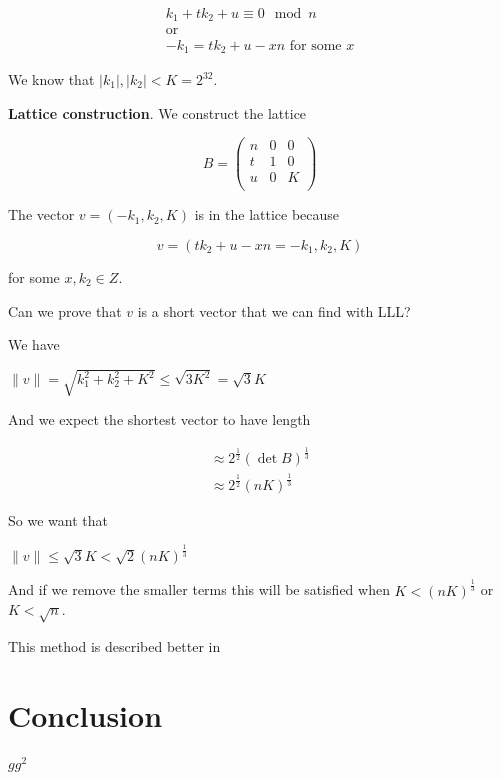 \documentclass[a4paper,12pt]{report}
\begin{document}
\[
    \begin{array}{c}
        k_1 + tk_2 + u \equiv 0 \mod n \\
        \text{or} \\
        -k_1 = tk_2 + u - xn \text{   for some $x$}
    \end{array}
\]

We know that $|k_1|, |k_2| < K = 2^{32}$.

\vspace*{10px}

\textbf{Lattice construction}. We construct the lattice

\[
    B = 
    \begin{pmatrix}
        n & 0 & 0 \\
        t & 1 & 0 \\
        u & 0 & K \\
    \end{pmatrix}
\]

The vector $v = (-k_1, k_2, K)$ is in the lattice because

\[
    v = (tk_2 + u - xn = -k_1, k_2, K)
\]

for some $x, k_2 \in Z$.

\vspace*{10px}

Can we prove that $v$ is a short vector that we can find with LLL?

We have 

\begin{center}
    $\lVert v \rVert = \sqrt{k_1^2 + k_2^2 + K^2} \le \sqrt{3K^2} = \sqrt{3}K $
\end{center}

And we expect the shortest vector to have length

\[
    \begin{array}{c}
        \approx 2^{\frac{1}{2}}(\det B)^{\frac{1}{3}} \\
        \approx 2^{\frac{1}{2}}(nK)^{\frac{1}{3}}
    \end{array}
\]

So we want that 

\begin{center}
    $\lVert v \rVert \le \sqrt{3}K < \sqrt{2}(nK)^{\frac{1}{3}}$
\end{center}

And if we remove the smaller terms this will be satisfied when $K < (nK)^{\frac{1}{3}}$ or $K < \sqrt{n}$.

This method is described better in


\chapter*{Conclusion}

$gg^2$



\end{document}

